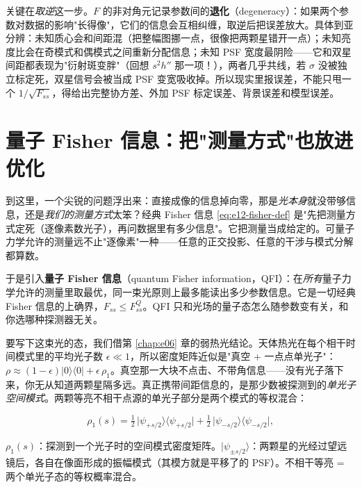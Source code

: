 关键在\emph{取逆}这一步。\(F\) 的非对角元记录参数间的\textbf{退化}（degeneracy）：如果两个参数对数据的影响"长得像"，它们的信息会互相纠缠，取逆后把误差放大。具体到亚分辨：未知质心会和间距混（把整幅图挪一点，很像把两颗星错开一点）；未知亮度比会在奇模式和偶模式之间重新分配信息；未知 PSF 宽度最阴险——它和双星间距都表现为"衍射斑变胖"（回想 \(s^2 h''\) 那一项！），两者几乎共线，若 \(\sigma\) 没被独立标定死，双星信号会被当成 PSF 变宽吸收掉。所以现实里报误差，不能只甩一个 \(1/\sqrt{F_{ss}}\)，得给出完整协方差、外加 PSF 标定误差、背景误差和模型误差。


\section{量子 Fisher 信息：把"测量方式"也放进优化}
\label{sec:e12-qfi}

到这里，一个尖锐的问题浮出来：直接成像的信息掉向零，那是\emph{光本身}就没带够信息，还是\emph{我们的测量方式}太笨？经典 Fisher 信息 \eqref{eq:e12-fisher-def} 是"先把测量方式定死（逐像素数光子），再问数据里有多少信息"。它把测量当成给定的。可量子力学允许的测量远不止"逐像素"一种——任意的正交投影、任意的干涉与模式分解都算数。

于是引入\textbf{量子 Fisher 信息}（quantum Fisher information，QFI）：在\emph{所有}量子力学允许的测量里取最优，同一束光原则上最多能读出多少参数信息。它是一切经典 Fisher 信息的上确界，\(F_{ss}\le F_{ss}^{Q}\)。QFI 只和光场的量子态怎么随参数变有关，和你选哪种探测器无关。

要写下这束光的态，我们借第 \ref{chap:e06} 章的弱热光结论。天体热光在每个相干时间模式里的平均光子数 \(\epsilon\ll1\)，所以密度矩阵近似是"真空 + 一点点单光子"：\(\rho\approx(1-\epsilon)|0\rangle\langle0|+\epsilon\,\rho_1\)。真空那一大块不点击、不带角信息——没有光子落下来，你无从知道两颗星隔多远。真正携带间距信息的，是那少数被探测到的\emph{单光子空间模式}。两颗等亮不相干点源的单光子部分是两个模式的等权混合：

\begin{equation}
  \rho_{1}(s)=\tfrac12\,\big|\psi_{+s/2}\big\rangle\big\langle\psi_{+s/2}\big|
             +\tfrac12\,\big|\psi_{-s/2}\big\rangle\big\langle\psi_{-s/2}\big|,
  \label{eq:e12-one-photon}
\end{equation}
\begin{formulaexplain}
\(\rho_1(s)\)：探测到一个光子时的空间模式密度矩阵。\(|\psi_{\pm s/2}\rangle\)：两颗星的光经过望远镜后，各自在像面形成的振幅模式（其模方就是平移了的 PSF）。不相干等亮 = 两个单光子态的等权概率混合。
\end{formulaexplain}

